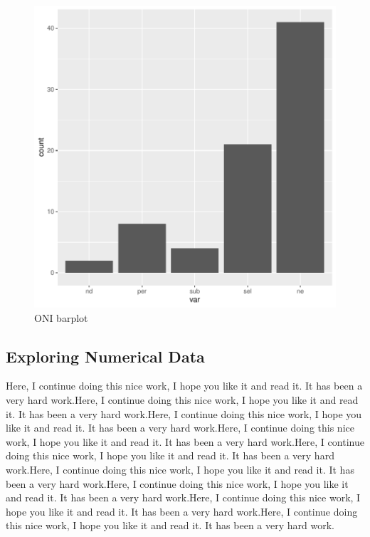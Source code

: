\documentclass[11pt]{article}
\begin{document}
\begin{figure}[h]
\centering
\begin{adjustbox}{width=7cm,height=5cm}
\includegraphics{PaperInR_8-cat_plot}
\end{adjustbox}
\caption{ONI barplot}  %
\label{catexplore_plot} %
\end{figure}





\subsection{Exploring Numerical Data}\label{numexplo}

Here, I continue doing this nice work, I hope you like it and read it. It has been a very hard work.Here, I continue doing this nice work, I hope you like it and read it. It has been a very hard work.Here, I continue doing this nice work, I hope you like it and read it. It has been a very hard work.Here, I continue doing this nice work, I hope you like it and read it. It has been a very hard work.Here, I continue doing this nice work, I hope you like it and read it. It has been a very hard work.Here, I continue doing this nice work, I hope you like it and read it. It has been a very hard work.Here, I continue doing this nice work, I hope you like it and read it. It has been a very hard work.Here, I continue doing this nice work, I hope you like it and read it. It has been a very hard work.Here, I continue doing this nice work, I hope you like it and read it. It has been a very hard work.
\end{document}
